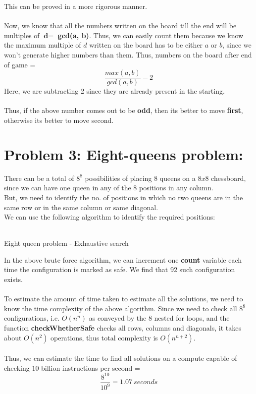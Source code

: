 \documentclass[12pt]{report}
\begin{document}
This can be proved in a more rigorous manner.
\\ \\ 
Now, we know that all the numbers written on the board till the end will be multiples of $\textbf{d}=$ \textbf{gcd(a, b)}. Thus, we can easily count them because we know the maximum multiple of  $d$ written on the board has to be either $a$ or $b$, since we won't generate higher numbers than them. Thus, numbers on the board after end of game = 
\[\frac{max(a, b)}{gcd(a, b)} - 2\]
Here, we are subtracting 2 since they are already present in the starting. 
\\ \\
Thus, if the above number comes out to be \textbf{odd}, then its better to move \textbf{first}, otherwise its better to move second.
\section{Problem 3: Eight-queens problem:}
There can be a total of $8^{8}$ possibilities of placing $8$ queens on a $8x8$ chessboard, since we can have one queen in any of the 8 positions in any column. 
\\
But, we need to identify the no. of positions in which no two queens are in the same row or in the same column or same diagonal. 
\\
We can use the following algorithm to identify the required positions: 
\\ \\
\begin{algorithm}[H]
	\SetAlgoLined
	\caption{Eight queen problem - Exhaustive search}	
\end{algorithm}
In the above brute force algorithm, we can increment one \textbf{count} variable each time the configuration is marked as safe. We find that 92 such configuration exists.
\\ \\
To estimate the amount of time taken to estimate all the solutions, we need to know the time complexity of the above algorithm. Since we need to check all $8^{8}$ configurations, i.e. $O(n^{n})$ as conveyed by the 8 nested for loops, and the function \textbf{checkWhetherSafe} checks all rows, columns and diagonals, it takes about $O(n^{2})$ operations, thus total complexity is $O(n^{n + 2})$. 
\\ \\
Thus, we can estimate the time to find all solutions on a compute capable of checking $10$ billion instructions per second = 
\[\frac{8^{10}}{10^{9}} = 1.07 \ seconds\]
\end{document}
